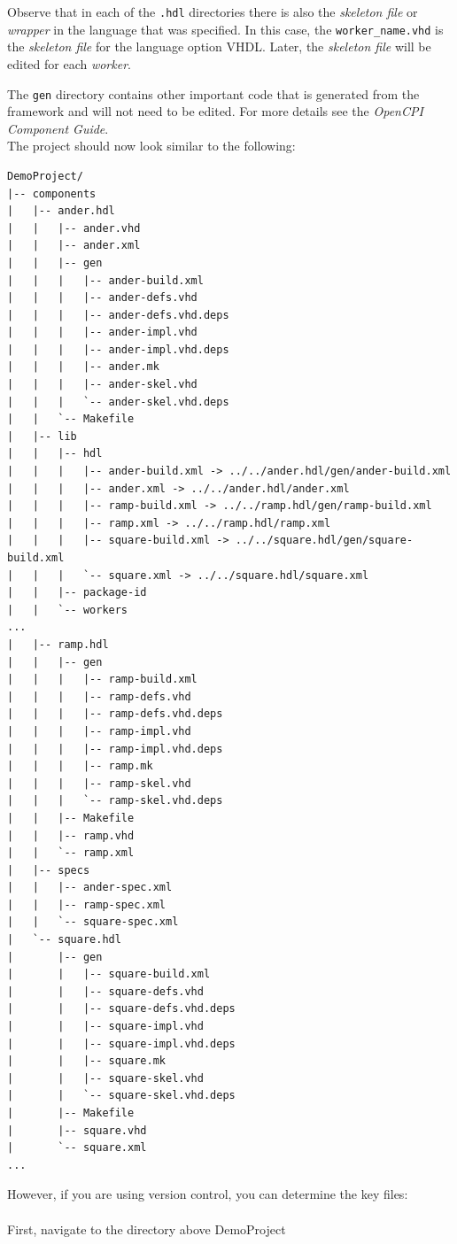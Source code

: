 Observe that in each of the \verb+.hdl+ directories there is also the \textit{skeleton file} or \textit{wrapper} in the language that was specified. In this case, the \verb+worker_name.vhd+ is the \textit{skeleton file} for the language option VHDL. Later, the \textit{skeleton file} will be edited for each \textit{worker}.\newline

The \verb+gen+ directory contains other important code that is generated from the framework and will not need to be edited. For more details see the \textit{OpenCPI Component Guide}.\\

\bstart
The project should now look similar to the following:
\begin{verbatim}
DemoProject/
|-- components
|   |-- ander.hdl
|   |   |-- ander.vhd
|   |   |-- ander.xml
|   |   |-- gen
|   |   |   |-- ander-build.xml
|   |   |   |-- ander-defs.vhd
|   |   |   |-- ander-defs.vhd.deps
|   |   |   |-- ander-impl.vhd
|   |   |   |-- ander-impl.vhd.deps
|   |   |   |-- ander.mk
|   |   |   |-- ander-skel.vhd
|   |   |   `-- ander-skel.vhd.deps
|   |   `-- Makefile
|   |-- lib
|   |   |-- hdl
|   |   |   |-- ander-build.xml -> ../../ander.hdl/gen/ander-build.xml
|   |   |   |-- ander.xml -> ../../ander.hdl/ander.xml
|   |   |   |-- ramp-build.xml -> ../../ramp.hdl/gen/ramp-build.xml
|   |   |   |-- ramp.xml -> ../../ramp.hdl/ramp.xml
|   |   |   |-- square-build.xml -> ../../square.hdl/gen/square-build.xml
|   |   |   `-- square.xml -> ../../square.hdl/square.xml
|   |   |-- package-id
|   |   `-- workers
...
|   |-- ramp.hdl
|   |   |-- gen
|   |   |   |-- ramp-build.xml
|   |   |   |-- ramp-defs.vhd
|   |   |   |-- ramp-defs.vhd.deps
|   |   |   |-- ramp-impl.vhd
|   |   |   |-- ramp-impl.vhd.deps
|   |   |   |-- ramp.mk
|   |   |   |-- ramp-skel.vhd
|   |   |   `-- ramp-skel.vhd.deps
|   |   |-- Makefile
|   |   |-- ramp.vhd
|   |   `-- ramp.xml
|   |-- specs
|   |   |-- ander-spec.xml
|   |   |-- ramp-spec.xml
|   |   `-- square-spec.xml
|   `-- square.hdl
|       |-- gen
|       |   |-- square-build.xml
|       |   |-- square-defs.vhd
|       |   |-- square-defs.vhd.deps
|       |   |-- square-impl.vhd
|       |   |-- square-impl.vhd.deps
|       |   |-- square.mk
|       |   |-- square-skel.vhd
|       |   `-- square-skel.vhd.deps
|       |-- Makefile
|       |-- square.vhd
|       `-- square.xml
...
\end{verbatim}
\bend
\bstart
However, if you are using version control, you can determine the key files:
\\\\
First, navigate to the directory above DemoProject

